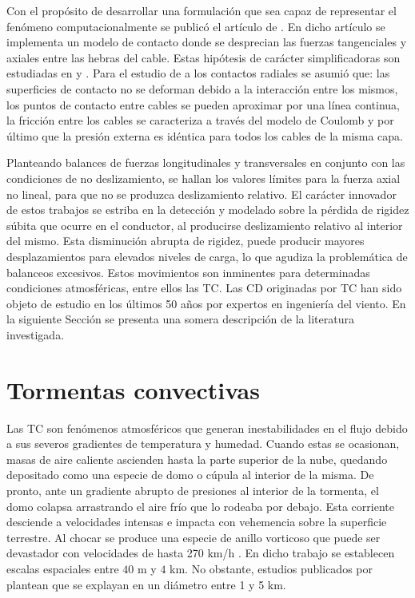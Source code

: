 Con el propósito de desarrollar una formulación que sea capaz de representar el fenómeno computacionalmente se publicó el artículo de \cite{Foti2016}. En dicho artículo se implementa un modelo de contacto donde se desprecian las fuerzas tangenciales y axiales entre las hebras del cable. Estas hipótesis de carácter simplificadoras son estudiadas en \citep{costello1990average} y \citep{rawlins2005flexure}. Para el estudio de a los contactos radiales se asumió que: las superficies de contacto no se deforman debido a la interacción entre los mismos, los puntos de contacto entre cables se pueden aproximar por una línea continua, la fricción entre los cables se caracteriza a través del modelo de Coulomb y por último que la presión externa es idéntica para todos los cables de la misma capa. 

Planteando balances de fuerzas longitudinales y transversales en conjunto con las condiciones de no deslizamiento, se hallan los valores límites para la fuerza axial no lineal, para que no se produzca deslizamiento relativo. El carácter innovador de estos trabajos se estriba en la detección y modelado sobre la pérdida de rigidez súbita que ocurre en el conductor, al producirse deslizamiento relativo al interior del mismo. Esta disminución abrupta de rigidez, puede producir mayores desplazamientos para elevados niveles de carga, lo que agudiza la problemática de balanceos excesivos. Estos movimientos son inminentes para determinadas condiciones atmosféricas, entre ellos las TC. Las CD originadas por TC han sido objeto de estudio en los últimos 50 años por expertos en ingeniería del viento. En la siguiente Sección se presenta una somera descripción de la literatura investigada. 

\section{Tormentas convectivas}\label{Sec:EA:TormentasConvectivas}

Las TC son fenómenos atmosféricos que generan inestabilidades en el flujo debido a sus severos gradientes de temperatura y humedad. Cuando estas se ocasionan, masas de aire caliente ascienden hasta la parte superior de la nube, quedando depositado como una especie de domo o cúpula al interior de la misma. De pronto, ante un gradiente abrupto de presiones al interior de la tormenta, el domo colapsa arrastrando el aire frío que lo rodeaba por debajo. Esta corriente desciende a velocidades intensas e impacta con vehemencia sobre la superficie terrestre. Al chocar se produce una especie de anillo vorticoso que puede ser devastador con velocidades de hasta 270 km/h \citep{fujita1985downburst}. En dicho trabajo se establecen escalas espaciales entre $40$ m y $4$ km. No obstante, estudios publicados por \cite{darwish2010dynamic} plantean que se explayan en un diámetro entre 1 y 5 km.

